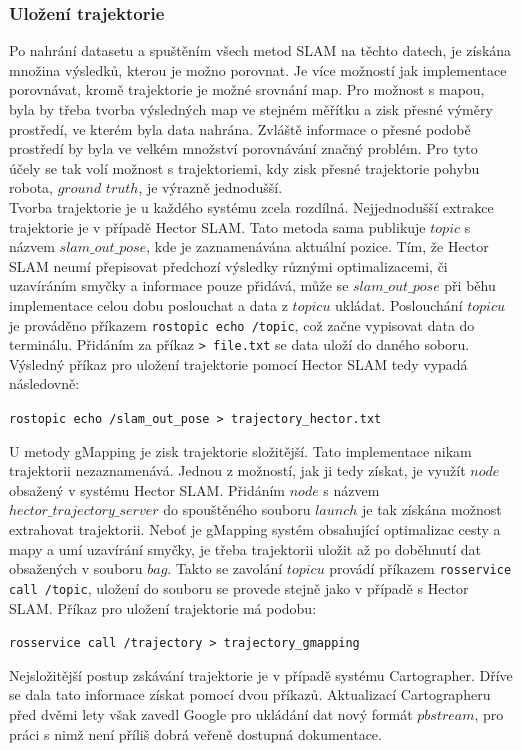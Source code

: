 \documentclass[12pt]{article}
\begin{document}
\subsubsection{Uložení trajektorie}
Po nahrání datasetu a spuštěním všech metod SLAM na těchto datech, je získána množina výsledků, kterou je možno porovnat. Je více možností jak implementace porovnávat, kromě trajektorie je možné srovnání map. Pro možnost s mapou, byla by třeba tvorba výsledných map ve stejném měřítku a zisk přesné výměry prostředí, ve kterém byla data nahrána. Zvláště informace o přesné podobě prostředí by byla ve velkém množství porovnávání značný problém. Pro tyto účely se tak volí možnost s trajektoriemi, kdy zisk přesné trajektorie pohybu robota, $ground$ $truth$, je výrazně jednodušší.\\
\indent Tvorba trajektorie je u každého systému zcela rozdílná. Nejjednodušší extrakce trajektorie je v případě Hector SLAM. Tato metoda sama publikuje $topic$ s názvem $slam\_out\_pose$, kde je zaznamenávána aktuální pozice. Tím, že Hector SLAM neumí přepisovat předchozí výsledky různými optimalizacemi, či uzavíráním smyčky a informace pouze přidává, může se $slam\_out\_pose$ při běhu implementace celou dobu poslouchat a data z $topicu$ ukládat. Poslouchání $topicu$ je prováděno příkazem \texttt{rostopic echo /topic}, což začne vypisovat data do terminálu. Přidáním za příkaz \texttt{> file.txt} se data uloží do daného soboru. Výsledný příkaz pro uložení trajektorie pomocí Hector SLAM tedy vypadá následovně:
\begin{center}
	\texttt{rostopic echo /slam\_out\_pose > trajectory\_hector.txt}
\end{center}
U metody gMapping je zisk trajektorie složitější. Tato implementace nikam trajektorii nezaznamenává. Jednou z možností, jak ji tedy získat, je využít $node$ obsažený v systému Hector SLAM. Přidáním $node$ s názvem $hector\_trajectory\_server$ do spouštěného souboru $launch$ je tak získána možnost extrahovat trajektorii. Neboť je gMapping systém obsahující optimalizac cesty a mapy a umí uzavírání smyčky, je třeba trajektorii uložit až po doběhnutí dat obsažených v souboru $bag$. Takto se zavolání $topicu$ provádí příkazem \texttt{rosservice call /topic}, uložení do souboru se provede stejně jako v případě s Hector SLAM. Příkaz pro uložení trajektorie má podobu:
\begin{center}
	\texttt{rosservice call /trajectory > trajectory\_gmapping}
\end{center}
Nejsložitější postup zskávání trajektorie je v případě systému Cartographer. Dříve se dala tato informace získat pomocí dvou příkazů. Aktualizací Cartographeru před dvěmi lety však zavedl Google pro ukládání dat nový formát $pbstream$, pro práci s nimž není příliš dobrá veřeně dostupná dokumentace. 
\end{document}
